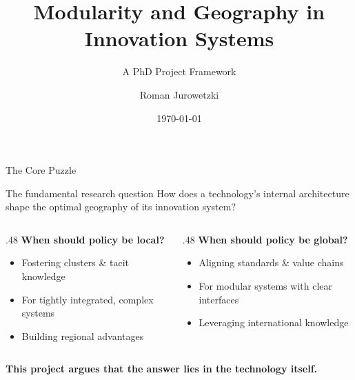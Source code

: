 \documentclass[10pt, aspectratio=169]{beamer}
\title{Modularity and Geography in Innovation Systems}
\subtitle{A PhD Project Framework}
\date{\today}
\author{
  Roman Jurowetzki
}
\institute[
  Aalborg University Business School\
  Denmark
]
{
  Aalborg University Business School\
  Denmark
}
\begin{document}
{\aauwavesbg%
\begin{frame}
  \titlepage
\end{frame}}

\begin{frame}{The Core Puzzle}
    \begin{block}{The fundamental research question}
        How does a technology's internal architecture shape the optimal geography of its innovation system?
    \end{block}
    
    \vfill
    
    \begin{columns}[T]
        \begin{column}{.48\textwidth}
            \textbf{When should policy be \textcolor{aauDarkBlue}{local}?}
            \begin{itemize}
                \item Fostering clusters & tacit knowledge
                \item For tightly integrated, complex systems
                \item Building regional advantages
            \end{itemize}
        \end{column}
        \begin{column}{.48\textwidth}
            \textbf{When should policy be \textcolor{aauDarkOrange}{global}?}
            \begin{itemize}
                \item Aligning standards & value chains
                \item For modular systems with clear interfaces
                \item Leveraging international knowledge
            \end{itemize}
        \end{column}
\end{columns}
    
    \vfill
    \centering
    \textbf{This project argues that the answer lies in the technology itself.}
\end{frame}
\end{document}
